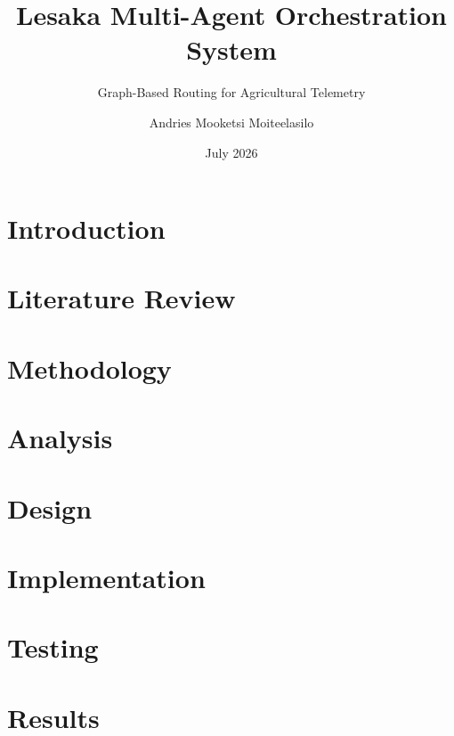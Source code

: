 \documentclass[12pt,a4paper]{report}
\title{Lesaka Multi-Agent Orchestration System}
\subtitle{Graph-Based Routing for Agricultural Telemetry}
\author{Andries Mooketsi Moiteelasilo}
\date{July 2026}
\begin{document}






\tableofcontents
\listoffigures
\listoftables


\chapter{Introduction}


\chapter{Literature Review}


\chapter{Methodology}


\chapter{Analysis}


\chapter{Design}


\chapter{Implementation}


\chapter{Testing}


\chapter{Results}

\end{document}
